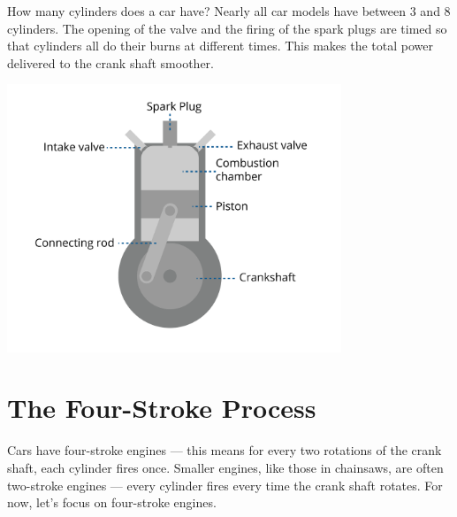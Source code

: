 How many cylinders does a car have?  Nearly all car models have between 3 and 8 cylinders. The opening of the valve and the firing of the spark plugs are timed so that cylinders all do their burns 
at different times. This makes the total power delivered to the crank shaft smoother.


\includegraphics[width=0.75\textwidth]{engine-08.png}


\section{The Four-Stroke Process}

Cars have four-stroke engines --- this means for every two rotations of the crank shaft,  each cylinder fires once.  Smaller engines, like those in chainsaws,  are often two-stroke engines --- every cylinder fires every time the crank shaft rotates.  For now,  let's focus on four-stroke engines.




